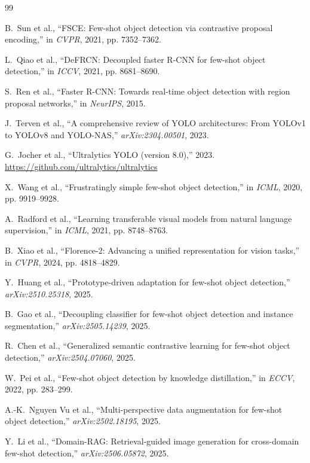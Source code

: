 \documentclass[conference]{IEEEtran}
\begin{document}
\begin{thebibliography}{99}

B.~Sun et al., ``FSCE: Few-shot object detection via contrastive proposal encoding,'' in \emph{CVPR}, 2021, pp. 7352--7362.

L.~Qiao et al., ``DeFRCN: Decoupled faster R-CNN for few-shot object detection,'' in \emph{ICCV}, 2021, pp. 8681--8690.

S.~Ren et al., ``Faster R-CNN: Towards real-time object detection with region proposal networks,'' in \emph{NeurIPS}, 2015.

J.~Terven et al., ``A comprehensive review of YOLO architectures: From YOLOv1 to YOLOv8 and YOLO-NAS,'' \emph{arXiv:2304.00501}, 2023.

G.~Jocher et al., ``Ultralytics YOLO (version 8.0),'' 2023. \url{https://github.com/ultralytics/ultralytics}

X.~Wang et al., ``Frustratingly simple few-shot object detection,'' in \emph{ICML}, 2020, pp. 9919--9928.

A.~Radford et al., ``Learning transferable visual models from natural language supervision,'' in \emph{ICML}, 2021, pp. 8748--8763.

B.~Xiao et al., ``Florence-2: Advancing a unified representation for vision tasks,'' in \emph{CVPR}, 2024, pp. 4818--4829.

Y.~Huang et al., ``Prototype-driven adaptation for few-shot object detection,'' \emph{arXiv:2510.25318}, 2025.

B.~Gao et al., ``Decoupling classifier for few-shot object detection and instance segmentation,'' \emph{arXiv:2505.14239}, 2025.

R.~Chen et al., ``Generalized semantic contrastive learning for few-shot object detection,'' \emph{arXiv:2504.07060}, 2025.

W.~Pei et al., ``Few-shot object detection by knowledge distillation,'' in \emph{ECCV}, 2022, pp. 283--299.

A.-K.~Nguyen Vu et al., ``Multi-perspective data augmentation for few-shot object detection,'' \emph{arXiv:2502.18195}, 2025.

Y.~Li et al., ``Domain-RAG: Retrieval-guided image generation for cross-domain few-shot detection,'' \emph{arXiv:2506.05872}, 2025.


\end{thebibliography}
\end{document}

